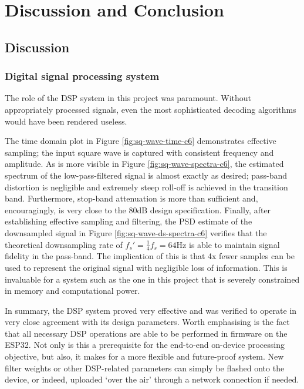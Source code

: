 \chapter{Discussion and Conclusion}
\label{chapter:discussion-conclusion}

\graphicspath{ {report/Chapter7/assets/} } 

\section{Discussion}

\subsection{Digital signal processing system}
The role of the DSP system in this project was paramount. Without appropriately processed signals, even the most sophisticated decoding algorithms would have been rendered useless. 

The time domain plot in Figure \ref{fig:sq-wave-time-c6} demonstrates effective sampling; the input square wave is captured with consistent frequency and amplitude. As is more visible in Figure \ref{fig:sq-wave-spectra-c6}, the estimated spectrum of the low-pass-filtered signal is almost exactly as desired; pass-band distortion is negligible and extremely steep roll-off is achieved in the transition band. Furthermore, stop-band attenuation is more than sufficient and, encouragingly, is very close to the 80dB design specification. Finally, after establishing effective sampling and filtering, the PSD estimate of the downsampled signal in Figure \ref{fig:sq-wave-ds-spectra-c6} verifies that the theoretical downsampling rate of $f_s'=\frac{1}{4}f_s = 64$Hz is able to maintain signal fidelity in the pass-band. The implication of this is that 4x fewer samples can be used to represent the original signal with negligible loss of information. This is invaluable for a system such as the one in this project that is severely constrained in memory and computational power.

In summary, the DSP system proved very effective and was verified to operate in very close agreement with its design parameters. Worth emphasising is the fact that all necessary DSP operations are able to be performed in firmware on the ESP32. Not only is this a prerequisite for the end-to-end on-device processing objective, but also, it makes for a more flexible and future-proof system. New filter weights or other DSP-related parameters can simply be flashed onto the device, or indeed, uploaded `over the air' through a network connection if needed.
